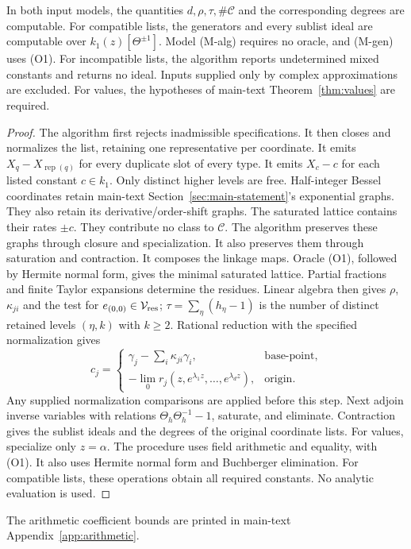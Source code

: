 \begin{proposition}\label{prop:algorithm}
In both input models, the quantities $d,\rho,\tau,\#\mathcal C$ and the
corresponding degrees are computable. For compatible lists, the generators
and every sublist ideal are computable over $k_1(z)[\Theta^{\pm1}]$.
Model (M-alg) requires no oracle, and (M-gen) uses (O1). For incompatible
lists, the algorithm reports undetermined mixed constants and returns no
ideal. Inputs supplied only by complex approximations are excluded.
For values, the hypotheses of main-text Theorem~\ref{thm:values} are required.
\end{proposition}
\begin{proof}

The algorithm first rejects inadmissible specifications. It then closes
and normalizes the list, retaining one representative per coordinate.
It emits $X_q-X_{\operatorname{rep}(q)}$ for every duplicate slot of every type.
It emits $X_c-c$ for each listed constant $c\in k_1$.
Only distinct higher levels are free.
Half-integer Bessel coordinates retain main-text Section~\ref{sec:main-statement}'s exponential graphs.
They also retain its derivative/order-shift graphs.
The saturated lattice contains their rates $\pm c$.
They contribute no class to $\mathcal C$.
The algorithm preserves these graphs through closure and specialization.
It also preserves them through saturation and contraction.
It composes the linkage maps. Oracle (O1), followed by
Hermite normal form, gives the minimal saturated lattice. Partial
fractions and finite Taylor expansions determine the residues. Linear algebra then gives $\rho$, $\kappa_{ji}$ and the test for
$e_{(0,0)}\in\mathcal V_{\rm res}$; $\tau=\sum_\eta(h_\eta-1)$ is the number of distinct retained levels $(\eta,k)$ with $k\ge2$. Rational reduction with the specified
normalization gives
\begin{equation}\label{eq:relation-constants}
c_j=\begin{cases}\gamma_j-\sum_i\kappa_{ji}\gamma_i,&\text{base-point},\\
-\lim_0r_j(z,e^{\lambda_1z},\ldots,e^{\lambda_dz}),&\text{origin}.
\end{cases}
\end{equation}
Any supplied normalization comparisons are applied before this step.
Next adjoin inverse variables with relations
$\Theta_h\Theta_h^{-1}-1$, saturate, and eliminate. Contraction gives
the sublist ideals and the degrees of the original coordinate lists.
For values, specialize only $z=\alpha$.
The procedure uses field arithmetic and equality, with (O1).
It also uses Hermite normal form and Buchberger elimination.
For compatible lists, these operations obtain all required constants.
No analytic evaluation is used.
\end{proof}

The arithmetic coefficient bounds are printed in main-text Appendix~\ref{app:arithmetic}.
